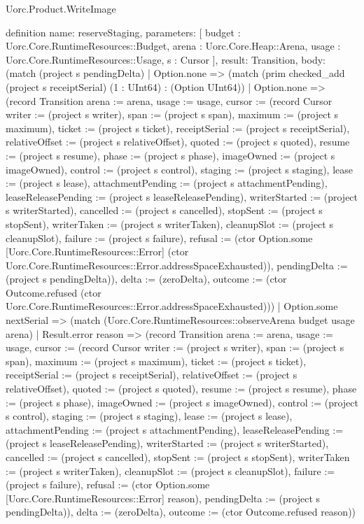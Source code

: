 \begin{lexlean}{Uorc.Product.WriteImage}
\begin{semanticmodule}
definition{
  name: reserveStaging,
  parameters: [
    budget : Uorc.Core.RuntimeResources::Budget,
    arena : Uorc.Core.Heap::Arena,
    usage : Uorc.Core.RuntimeResources::Usage,
    s : Cursor
  ],
  result: Transition,
  body: (match (project s pendingDelta)
    | Option.none => (match (prim checked_add (project s receiptSerial) (1 : UInt64) : (Option UInt64))
      | Option.none => (record Transition {arena := arena, usage := usage, cursor := (record Cursor {writer := (project s writer), span := (project s span), maximum := (project s maximum), ticket := (project s ticket), receiptSerial := (project s receiptSerial), relativeOffset := (project s relativeOffset), quoted := (project s quoted), resume := (project s resume), phase := (project s phase), imageOwned := (project s imageOwned), control := (project s control), staging := (project s staging), lease := (project s lease), attachmentPending := (project s attachmentPending), leaseReleasePending := (project s leaseReleasePending), writerStarted := (project s writerStarted), cancelled := (project s cancelled), stopSent := (project s stopSent), writerTaken := (project s writerTaken), cleanupSlot := (project s cleanupSlot), failure := (project s failure), refusal := (ctor Option.some [Uorc.Core.RuntimeResources::Error] (ctor Uorc.Core.RuntimeResources::Error.addressSpaceExhausted)), pendingDelta := (project s pendingDelta)}), delta := (zeroDelta), outcome := (ctor Outcome.refused (ctor Uorc.Core.RuntimeResources::Error.addressSpaceExhausted))})
      | Option.some nextSerial => (match (Uorc.Core.RuntimeResources::observeArena budget usage arena)
        | Result.error reason => (record Transition {arena := arena, usage := usage, cursor := (record Cursor {writer := (project s writer), span := (project s span), maximum := (project s maximum), ticket := (project s ticket), receiptSerial := (project s receiptSerial), relativeOffset := (project s relativeOffset), quoted := (project s quoted), resume := (project s resume), phase := (project s phase), imageOwned := (project s imageOwned), control := (project s control), staging := (project s staging), lease := (project s lease), attachmentPending := (project s attachmentPending), leaseReleasePending := (project s leaseReleasePending), writerStarted := (project s writerStarted), cancelled := (project s cancelled), stopSent := (project s stopSent), writerTaken := (project s writerTaken), cleanupSlot := (project s cleanupSlot), failure := (project s failure), refusal := (ctor Option.some [Uorc.Core.RuntimeResources::Error] reason), pendingDelta := (project s pendingDelta)}), delta := (zeroDelta), outcome := (ctor Outcome.refused reason)})
}
\end{semanticmodule}
\end{lexlean}
